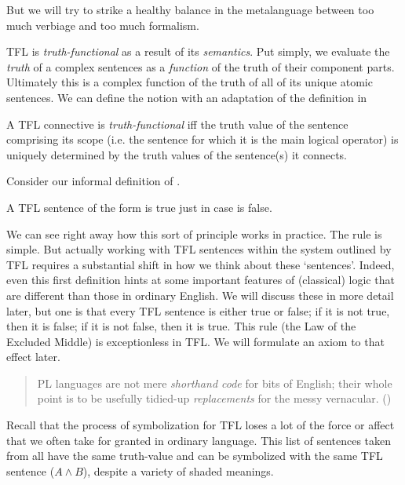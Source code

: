But we will try to strike a healthy balance in the metalanguage between too
much verbiage and too much formalism.

TFL is \emph{truth-functional} as a result of its \emph{semantics}. Put simply,
we evaluate the \emph{truth} of a complex sentences as a \emph{function} of the
truth of their component parts. Ultimately this is a complex function of the
truth of all of its unique atomic sentences. We can define the notion with an
adaptation of the definition in \cite[][p. 72]{Mag25}

\begin{definition}
  \label{def:truth-functional}
  A TFL connective is \emph{truth-functional} iff the truth value of the
  sentence comprising its scope (i.e. the sentence for which it is the main
  logical operator) is uniquely determined by the truth values of the
  sentence(s) it connects.
\end{definition}

Consider our informal definition of \enot\ephi.

\begin{argument}
\item[] A TFL sentence of the form \enot\ephi is true just in case \ephi is
  false. 
\end{argument}

We can see right away how this sort of principle works in practice. The rule is
simple. But actually working with TFL sentences within the system outlined by
TFL requires a substantial shift in how we think about these `sentences'.
Indeed, even this first definition hints at some important features of
(classical) logic that are different than those in ordinary English. We will
discuss these in more detail later, but one is that every TFL sentence is
either true or false; if it is not true, then it is false; if it is not false,
then it is true. This rule (the Law of the Excluded Middle) is exceptionless in
TFL. We will formulate an axiom to that effect later.

\begin{quote}
  PL languages are not mere \emph{shorthand code} for bits of English; their
  whole point is to be usefully tidied-up \emph{replacements} for the messy
  vernacular. (\cite[][p. 83]{Smi20})
\end{quote}

Recall that the process of symbolization for TFL loses a lot of the force or
affect that we often take for granted in ordinary language. This list of
sentences taken from \cite[][p. 73]{Mag25} all have the same truth-value and
can be symbolized with the same TFL sentence ($A \wedge B$), despite a variety
of shaded meanings.

